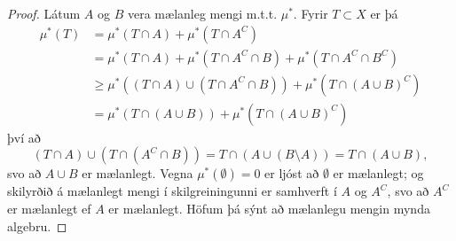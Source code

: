 \documentclass[a4paper,icelandic,11pt]{book}
\theoremstyle{plain}      \newtheorem{setn}{Setning}[chapter]
\theoremstyle{definition} \newtheorem{skilgr}[setn]{Skilgreining}
\theoremstyle{remark}     \newtheorem*{ath}{Athugasemd}
\begin{document}
\begin{proof}
  Látum $A$ og $B$ vera mælanleg mengi m.t.t. $\mu^{*}$. Fyrir
  $T\subset{X}$ er þá
  \begin{align*}
    \mu^{*}(T)
    &= \mu^{*}(T\cap A) + \mu^{*}(T\cap A^{C})
    \\
    &= \mu^{*}(T\cap A)
    + \mu^{*}(T\cap A^{C}\cap B)
    + \mu^{*}(T\cap A^{C}\cap B^{C})
    \\
    &\ge \mu^{*}((T\cap A)\cup(T\cap A^{C}\cap B))
    + \mu^{*}(T\cap (A\cup B)^{C})
    \\
    &= \mu^{*}(T\cap(A\cup B)) + \mu^{*}(T\cap(A\cup B)^{C})
  \end{align*}
  því að
  \[
  (T\cap A)\cup(T\cap(A^{C}\cap B))
  = T\cap(A\cup(B\setminus A))
  = T\cap(A\cup B),
  \]
  svo að $A\cup B$ er mælanlegt. Vegna $\mu^{*}(\emptyset)=0$ er ljóst
  að $\emptyset$ er mælanlegt; og skilyrðið á mælanlegt mengi í
  skilgreiningunni er samhverft í $A$ og $A^{C}$, svo að $A^{C}$ er
  mælanlegt ef $A$ er mælanlegt. Höfum þá sýnt að mælanlegu mengin
  mynda algebru.


\end{proof}
\end{document}
